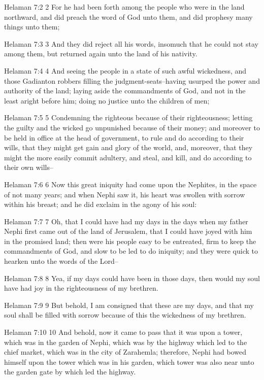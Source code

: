 Helaman 7:2
 2 For he had been forth among the people who were in the land
northward, and did preach the word of God unto them, and did
prophesy many things unto them;

Helaman 7:3
 3 And they did reject all his words, insomuch that he could not
stay among them, but returned again unto the land of his
nativity.

Helaman 7:4
 4 And seeing the people in a state of such awful wickedness, and
those Gadianton robbers filling the judgment-seats--having
usurped the power and authority of the land; laying aside the
commandments of God, and not in the least aright before him;
doing no justice unto the children of men;

Helaman 7:5
 5 Condemning the righteous because of their righteousness;
letting the guilty and the wicked go unpunished because of their
money; and moreover to be held in office at the head of
government, to rule and do according to their wills, that they
might get gain and glory of the world, and, moreover, that they
might the more easily commit adultery, and steal, and kill, and
do according to their own wills--

Helaman 7:6
 6 Now this great iniquity had come upon the Nephites, in the
space of not many years; and when Nephi saw it, his heart was
swollen with sorrow within his breast; and he did exclaim in the
agony of his soul:

Helaman 7:7
 7 Oh, that I could have had my days in the days when my father
Nephi first came out of the land of Jerusalem, that I could have
joyed with him in the promised land; then were his people easy to
be entreated, firm to keep the commandments of God, and slow to
be led to do iniquity; and they were quick to hearken unto the
words of the Lord--

Helaman 7:8
 8 Yea, if my days could have been in those days, then would my
soul have had joy in the righteousness of my brethren.

Helaman 7:9
 9 But behold, I am consigned that these are my days, and that my
soul shall be filled with sorrow because of this the wickedness
of my brethren.

Helaman 7:10
 10 And behold, now it came to pass that it was upon a tower,
which was in the garden of Nephi, which was by the highway which
led to the chief market, which was in the city of Zarahemla;
therefore, Nephi had bowed himself upon the tower which was in
his garden, which tower was also near unto the garden gate by
which led the highway.

